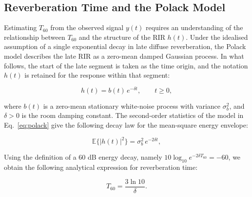 \documentclass[a4paper,fleqn]{cas-sc}
\begin{document}


\subsection{Reverberation Time and the Polack Model}
\label{sec:polack}



Estimating $T_{60}$ from the observed signal $y(t)$ requires an understanding of the relationship between $T_{60}$ and the structure of the RIR $h(t)$. Under the idealised assumption of a single exponential decay in late diffuse reverberation, the Polack model \citep{polack1988these} describes the late RIR as a zero-mean damped Gaussian process. In what follows, the start of the late segment is taken as the time origin, and the notation $h(t)$ is retained for the response within that segment:



\begin{equation}
h(t) = b(t)\, e^{-\delta t},\qquad t\geq 0, \tag{2}\label{eq:polack}
\end{equation}



\noindent where $b(t)$ is a zero-mean stationary white-noise process with variance $\sigma_b^{2}$, and $\delta>0$ is the room damping constant. The second-order statistics of the model in Eq.~\eqref{eq:polack} give the following decay law for the mean-square energy envelope:



\begin{equation}
\mathbb{E}\{|h(t)|^{2}\} = \sigma_b^{2}\,e^{-2\delta t}, \tag{3}\label{eq:energy_decay}
\end{equation}



Using the definition of a 60 dB energy decay, namely $10\log_{10} e^{-2\delta T_{60}} = -60$, we obtain the following analytical expression for reverberation time:



\begin{equation}
T_{60} = \frac{3\ln 10}{\delta}. \tag{4}\label{eq:t60_decay}
\end{equation}
\end{document}
